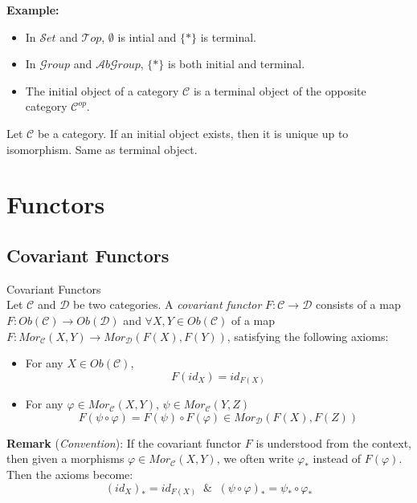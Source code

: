\noindent\textbf{Example:} 
\begin{itemize}
    \item In $\mathcal{S}et$ and $\mathcal{T}op$, $\emptyset$ is intial and $\{*\}$ is terminal.
    \item In $\mathcal{G}roup$ and $\mathcal{A}b\mathcal{G}roup$, $\{*\}$ is both initial and terminal.
    \item The initial object of a category $\mathcal{C}$ is a terminal object of the opposite category $\mathcal{C}^{op}$.
\end{itemize}

\begin{proposition}
    Let $\mathcal{C}$ be a category. If an initial object exists, then it is unique up to isomorphism. Same as terminal object.
\end{proposition}

\section{Functors}

\subsection{Covariant Functors}

\begin{definition}{Covariant Functors}\\
Let $\mathcal{C}$ and $\mathcal{D}$ be two categories. A \textit{covariant functor} $F: \mathcal{C} \to \mathcal{D}$ consists of a map $F: Ob(\mathcal{C}) \to Ob(\mathcal{D})$ and $\forall X,Y \in Ob(\mathcal{C})$ of a map $F: Mor_\mathcal{C} (X,Y) \to Mor_\mathcal{D} (F(X), F(Y))$, satisfying the following axioms:
\begin{itemize}
    \item For any $X \in Ob(\mathcal{C})$, 
    $$F(id_X) = id_{F(X)}$$
    \item For any $\varphi \in Mor_\mathcal{C} (X,Y)$, $\psi \in Mor_\mathcal{C}(Y,Z)$
    $$F(\psi \circ \varphi) = F(\psi) \circ F(\varphi) \in Mor_\mathcal{D} (F(X), F(Z))$$
\end{itemize}
\end{definition}

\noindent\textbf{Remark} (\textit{Convention}): If the covariant functor $F$ is understood from the context, then given a morphisms $\varphi \in Mor_\mathcal{C} (X,Y)$, we often write $\varphi_*$ instead of $F(\varphi)$. Then the axioms become:
$$(id_X)_* = id_{F(X)} \;\;\&\;\; (\psi \circ \varphi)_* = \psi_* \circ \varphi_*$$

